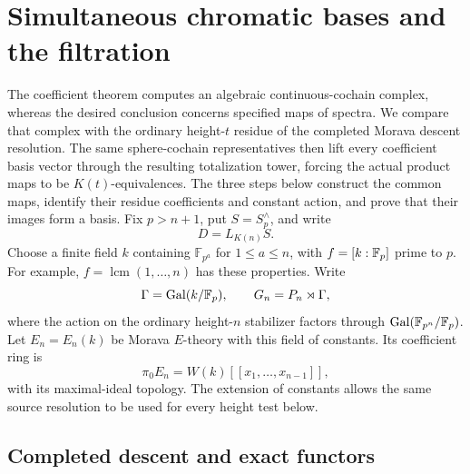\section{Simultaneous chromatic bases and the filtration}
\label{sec:spectral}

The coefficient theorem computes an algebraic continuous-cochain
complex, whereas the desired conclusion concerns specified maps of
spectra. We compare that complex with the ordinary height-\(t\)
residue of the completed Morava descent resolution. The same
sphere-cochain representatives then lift every coefficient basis
vector through the resulting totalization tower, forcing the actual
product maps to be \(K(t)\)-equivalences. The three steps below
construct the common maps, identify their residue coefficients and
constant action, and prove that their images form a basis. Fix
\(p>n+1\), put \(S=S_p^\wedge\), and write
\[
D=L_{K(n)}S.
\]
Choose a finite field \(k\) containing \(\mathbb F_{p^a}\) for
\(1\leq a\leq n\), with \(f=[k:\mathbb F_p]\) prime to \(p\). For example,
\(f=\operatorname{lcm}(1,\ldots,n)\) has these properties. Write
\[
\Gamma=\operatorname{Gal}(k/\mathbb F_p),\qquad
G_n=P_n\rtimes\Gamma,
\]
where the action on the ordinary height-\(n\) stabilizer factors through
\(\operatorname{Gal}(\mathbb F_{p^n}/\mathbb F_p)\). Let \(E_n=E_n(k)\) be Morava
\(E\)-theory with this field of constants. Its coefficient ring is
\[
\pi_0E_n=W(k)[[x_1,\ldots,x_{n-1}]],
\]
with its maximal-ideal topology. The extension of constants allows the
same source resolution to be used for every height test below.

\subsection{Completed descent and exact functors}

